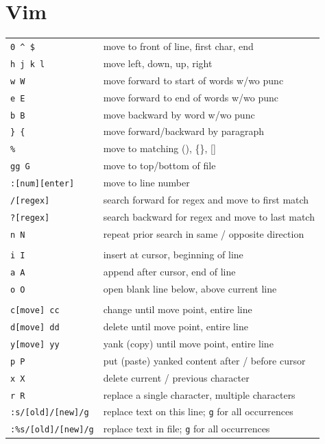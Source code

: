 \documentclass[10pt,twoside,openright]{memoir}
\begin{document}
\chapter{Vim}

{\footnotesize
\begin{tabular}{ll}
\texttt{0 \^{} \$} & move to front of line, first char, end \\
\texttt{h j k l} & move left, down, up, right \\
\texttt{w W} & move forward to start of words w/wo punc \\
\texttt{e E} & move forward to end of words w/wo punc \\
\texttt{b B} & move backward by word w/wo punc \\
\texttt{\} \{} & move forward/backward by paragraph \\
\texttt{\%} & move to matching (), \{\}, [] \\
\texttt{gg G} & move to top/bottom of file \\
\texttt{:[num][enter]} & move to line number \\
\texttt{/[regex]} & search forward for regex and move to first match \\
\texttt{?[regex]} & search backward for regex and move to last match \\
\texttt{n N} & repeat prior search in same / opposite direction \\
& \\
\texttt{i I} & insert at cursor, beginning of line \\
\texttt{a A} & append after cursor, end of line \\
\texttt{o O} & open blank line below, above current line \\
& \\
\texttt{c[move] cc} & change until move point, entire line \\
\texttt{d[move] dd} & delete until move point, entire line \\
\texttt{y[move] yy} & yank (copy) until move point, entire line \\
\texttt{p P} & put (paste) yanked content after / before cursor \\
\texttt{x X} & delete current / previous character \\
\texttt{r R} & replace a single character, multiple characters\\
\texttt{:s/[old]/[new]/g} & replace text on this line; \texttt{g} for all occurrences \\
\texttt{:\%s/[old]/[new]/g} & replace text in file; \texttt{g} for all occurrences \\

\end{tabular}}
\end{document}
